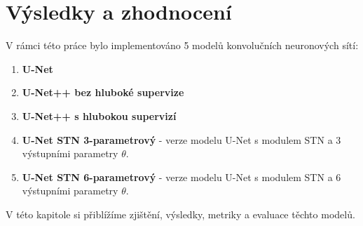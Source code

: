 \chapter{Výsledky a zhodnocení}
\label{sec:Chapter6}
V rámci této práce bylo implementováno 5 modelů konvolučních neuronových sítí:
\begin{enumerate}
    \item \textbf{U-Net}
    \item \textbf{U-Net++ bez hluboké supervize} 
    \item \textbf{U-Net++ s hlubokou supervizí}
    \item \textbf{U-Net STN 3-parametrový} - verze modelu U-Net s modulem STN a 3 výstupními parametry $\theta$.
    \item \textbf{U-Net STN 6-parametrový} - verze modelu U-Net s modulem STN a 6 výstupními parametry $\theta$.
\end{enumerate}
V této kapitole si přiblížíme zjištění, výsledky, metriky a evaluace těchto modelů.

\endinput